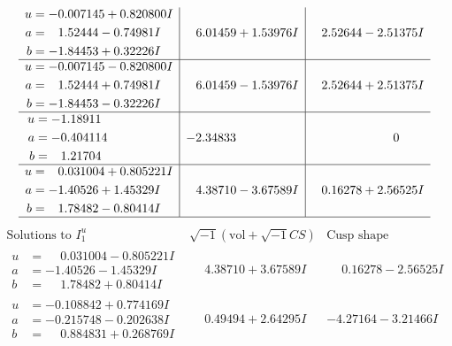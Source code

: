 \documentclass[1p]{elsarticle_modified}
\theoremstyle{definition}
\newcommand{\I}{\sqrt{-1}}
\begin{document}
$$\begin{array}{c|c|c}
\begin{aligned}
u &= -0.007145 + 0.820800 I \\
a &= \phantom{-}1.52444 - 0.74981 I \\
b &= -1.84453 + 0.32226 I\end{aligned}
 & \phantom{-}6.01459 + 1.53976 I & \phantom{-}2.52644 - 2.51375 I \\ \hline\begin{aligned}
u &= -0.007145 - 0.820800 I \\
a &= \phantom{-}1.52444 + 0.74981 I \\
b &= -1.84453 - 0.32226 I\end{aligned}
 & \phantom{-}6.01459 - 1.53976 I & \phantom{-}2.52644 + 2.51375 I \\ \hline\begin{aligned}
u &= -1.18911\phantom{ +0.000000I} \\
a &= -0.404114\phantom{ +0.000000I} \\
b &= \phantom{-}1.21704\phantom{ +0.000000I}\end{aligned}
 & -2.34833\phantom{ +0.000000I} & \phantom{-0.000000 } 0 \\ \hline\begin{aligned}
u &= \phantom{-}0.031004 + 0.805221 I \\
a &= -1.40526 + 1.45329 I \\
b &= \phantom{-}1.78482 - 0.80414 I\end{aligned}
 & \phantom{-}4.38710 - 3.67589 I & \phantom{-}0.16278 + 2.56525 I\\
 \hline 
 \end{array}$$\newpage$$\begin{array}{c|c|c}  
\text{Solutions to }I^u_{1}& \I (\text{vol} + \sqrt{-1}CS) & \text{Cusp shape}\\
 \hline 
\begin{aligned}
u &= \phantom{-}0.031004 - 0.805221 I \\
a &= -1.40526 - 1.45329 I \\
b &= \phantom{-}1.78482 + 0.80414 I\end{aligned}
 & \phantom{-}4.38710 + 3.67589 I & \phantom{-}0.16278 - 2.56525 I \\ \hline\begin{aligned}
u &= -0.108842 + 0.774169 I \\
a &= -0.215748 - 0.202638 I \\
b &= \phantom{-}0.884831 + 0.268769 I\end{aligned}
 & \phantom{-}0.49494 + 2.64295 I & -4.27164 - 3.21466 I \\ \hline\begin{aligned}

\end{aligned}
\end{array}$$
\end{document}
